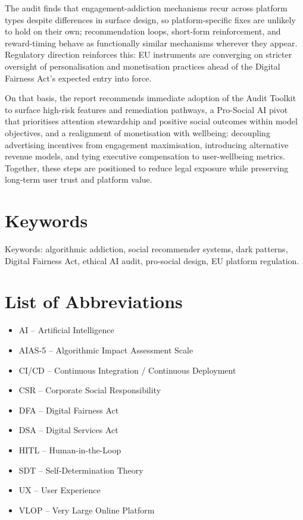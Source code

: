 \documentclass[11pt]{article}
\begin{document}
The audit finds that engagement-addiction mechanisms recur across platform types despite differences in surface design, so platform-specific fixes are unlikely to hold on their own; recommendation loops, short-form reinforcement, and reward-timing behave as functionally similar mechanisms wherever they appear. Regulatory direction reinforces this: EU instruments are converging on stricter oversight of personalisation and monetisation practices ahead of the Digital Fairness Act's expected entry into force.

On that basis, the report recommends immediate adoption of the Audit Toolkit to surface high-risk features and remediation pathways, a Pro-Social AI pivot that prioritises attention stewardship and positive social outcomes within model objectives, and a realignment of monetisation with wellbeing: decoupling advertising incentives from engagement maximisation, introducing alternative revenue models, and tying executive compensation to user-wellbeing metrics. Together, these steps are positioned to reduce legal exposure while preserving long-term user trust and platform value.

\section*{Keywords}
Keywords: algorithmic addiction, social recommender systems, dark patterns, Digital Fairness Act, ethical AI audit, pro-social design, EU platform regulation.

\newpage
\tableofcontents
\newpage

\listoftables
{}

\section*{List of Abbreviations}
\begin{itemize}
\item AI -- Artificial Intelligence
\item AIAS-5 -- Algorithmic Impact Assessment Scale
\item CI/CD -- Continuous Integration / Continuous Deployment
\item CSR -- Corporate Social Responsibility
\item DFA -- Digital Fairness Act
\item DSA -- Digital Services Act
\item HITL -- Human-in-the-Loop
\item SDT -- Self-Determination Theory
\item UX -- User Experience
\item VLOP -- Very Large Online Platform
\end{itemize}
\end{document}
